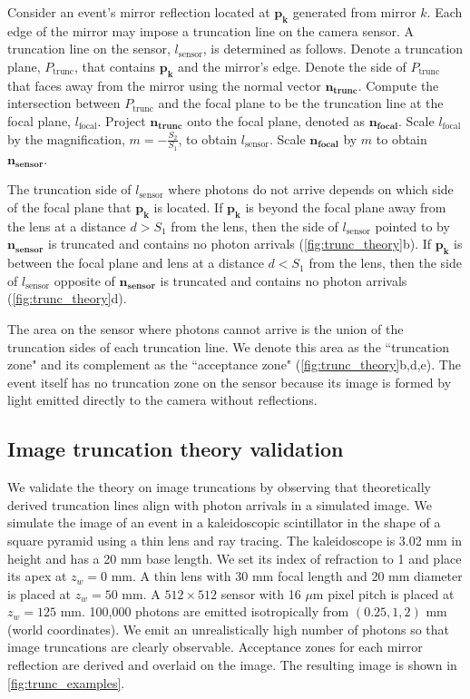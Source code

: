 Consider an event's mirror reflection located at $\bm{p_k}$ generated from mirror $k$.
Each edge of the mirror may impose a truncation line on the camera sensor.
A truncation line on the sensor, $l_\text{sensor}$, is determined as follows.
Denote a truncation plane, $P_{\text{trunc}}$, that contains $\bm{p_k}$ and the 
mirror's edge.
Denote the side of $P_{\text{trunc}}$ that faces away from the mirror using the 
normal vector $\bm{n_{\text{trunc}}}$.
Compute the intersection between $P_{\text{trunc}}$ and the focal plane to be the
truncation line at the focal plane, $l_\text{focal}$.
Project $\bm{n_{\text{trunc}}}$ onto the focal plane, denoted as 
$\bm{n_{\text{focal}}}$.
Scale $l_\text{focal}$ by the magnification, $m=-\frac{S_2}{S_1}$, to obtain $l_\text{sensor}$.
Scale $\bm{n_{\text{focal}}}$ by $m$ to obtain $\bm{n_{\text{sensor}}}$.

The truncation side of $l_\text{sensor}$ where photons do not arrive depends on 
which side of the focal plane that $\bm{p_k}$ is located.
If $\bm{p_k}$ is beyond the focal plane away from the lens at a distance $d>S_1$ 
from the lens, 
then the side of $l_\text{sensor}$ pointed to by $\bm{n_{\text{sensor}}}$ is 
truncated and contains no photon arrivals (\cref{fig:trunc_theory}b).
If $\bm{p_k}$ is between the focal plane and lens at a distance $d<S_1$ from the lens, 
then the side of $l_\text{sensor}$ opposite of $\bm{n_{\text{sensor}}}$ 
is truncated and contains no photon arrivals (\cref{fig:trunc_theory}d).

The area on the sensor where photons cannot arrive is the union of the
truncation sides of each truncation line.
We denote this area as the ``truncation zone" and its complement as the 
``acceptance zone" (\cref{fig:trunc_theory}b,d,e).
The event itself has no truncation zone on the sensor because its image is formed 
by light emitted directly to the camera without reflections.

\subsection{Image truncation theory validation}
We validate the theory on image truncations by observing that theoretically 
derived truncation lines align with photon arrivals in a simulated image.
We simulate the image of an event in a kaleidoscopic scintillator in the shape of 
a square pyramid using a thin lens and ray tracing. 
The kaleidoscope is 3.02 mm in height and has a 20 mm base length.
We set its index of refraction to 1 and place its apex at $z_w=0$ mm.
A thin lens with 30 mm focal length and 20 mm diameter is placed at $z_w=50$ mm.
A $512 \times 512$ sensor with 16 $\mu$m pixel pitch is placed at $z_w=125$ mm.
100,000 photons are emitted isotropically from $(0.25, 1, 2)$ mm (world 
coordinates).
We emit an unrealistically high number of photons so that image truncations are 
clearly observable.
Acceptance zones for each mirror reflection are derived and overlaid on the image.
The resulting image is shown in \cref{fig:trunc_examples}.

